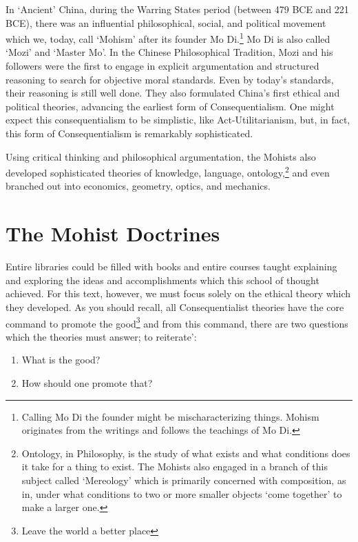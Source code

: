 In `Ancient' China, during the Warring States period (between 479 BCE and 221 BCE), there was an influential philosophical, social, and political movement which we, today, call `Mohism' after its founder Mo Di.\footnote{Calling Mo Di the founder might be mischaracterizing things. Mohism originates from the writings and follows the teachings of Mo Di.} Mo Di is also called `Mozi' and `Master Mo'. In the Chinese Philosophical Tradition, Mozi and his followers were the first to engage in explicit argumentation and structured reasoning to search for objective moral standards. Even by today's standards, their reasoning is still well done. They also formulated China's first ethical and political theories, advancing the earliest form of Consequentialism. One might expect this consequentialism to be simplistic, like Act-Utilitarianism, but, in fact, this form of Consequentialism is remarkably sophisticated.

Using critical thinking and philosophical argumentation, the Mohists also developed sophisticated theories of knowledge, language, ontology,\footnote{Ontology, in Philosophy, is the study of what exists and what conditions does it take for a thing to exist. The Mohists also engaged in a branch of this subject called `Mereology' which is primarily concerned with composition, as in, under what conditions to two or more smaller objects `come together' to make a larger one.} and even branched out into economics, geometry, optics, and mechanics.\autocite{sep-mohism}

\section{The Mohist Doctrines}

Entire libraries could be filled with books and entire courses taught explaining and exploring the ideas and accomplishments which this school of thought achieved. For this text, however, we must focus solely on the ethical theory which they developed. As you should recall, all Consequentialist theories have the core command to promote the good\footnote{Leave the world a better place} and from this command, there are two questions which the theories must answer; to reiterate':

\begin{enumerate}
\item What is the good?
\item How should one promote that?
\end{enumerate}

